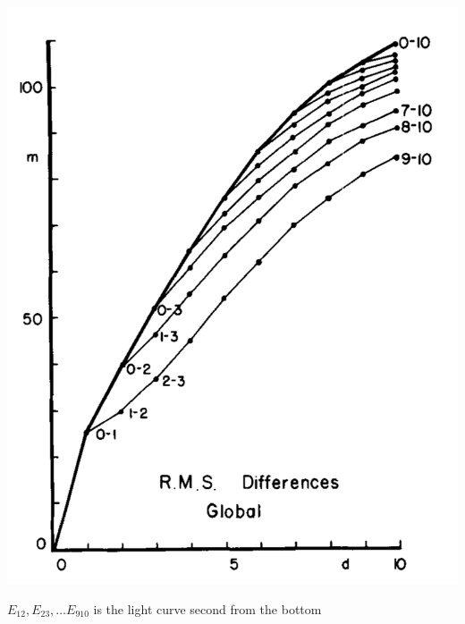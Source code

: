 \documentclass[aspectratio=169]{beamer}
\begin{document}
\begin{frame}

\begin{center}
\includegraphics[height = 0.8\textheight]{figures/lorenz_atmospheric_1982_fig1}
\end{center}

\vfill
$E_{12}, E_{23}, \ldots E_{910}$ is the light curve second from the bottom

\end{frame}
\end{document}
